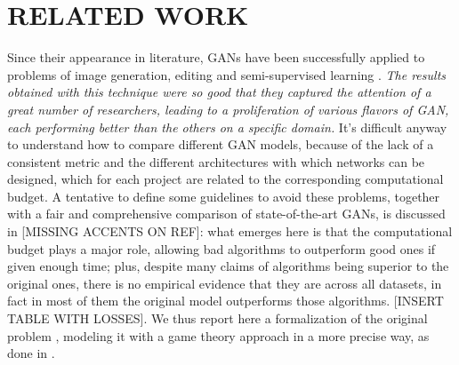 \section{RELATED WORK} \label{relatedwork}

Since their appearance in literature, GANs have been successfully applied to problems of image generation, editing and semi-supervised learning \cite{DBLP:journals/corr/RadfordMC15} \cite{DBLP:journals/corr/ZhangXLZHWM16}. \textit{The results obtained with this technique were so good that they captured the attention of a great number of researchers, leading to a proliferation of various flavors of GAN, each performing better than the others on a specific domain.} It's difficult anyway to understand how to compare different GAN models, because of the lack of a consistent metric and the different architectures with which networks can be designed, which for each project are related to the corresponding computational budget. A tentative to define some guidelines to avoid these problems, together with a fair and comprehensive comparison of state-of-the-art GANs, is discussed in \cite{46506}[MISSING ACCENTS ON REF]: what emerges here is that the computational budget plays a major role, allowing bad algorithms to outperform good ones if given enough time; plus, despite many claims of algorithms being superior to the original ones, there is no empirical evidence that they are across all datasets, in fact in most of them the original model outperforms those algorithms. [INSERT TABLE WITH LOSSES].
We thus report here a formalization of the original problem \cite{NIPS2014_5423}, modeling it with a game theory approach in a more precise way, as done in \cite{2017arXiv171200679O}.

